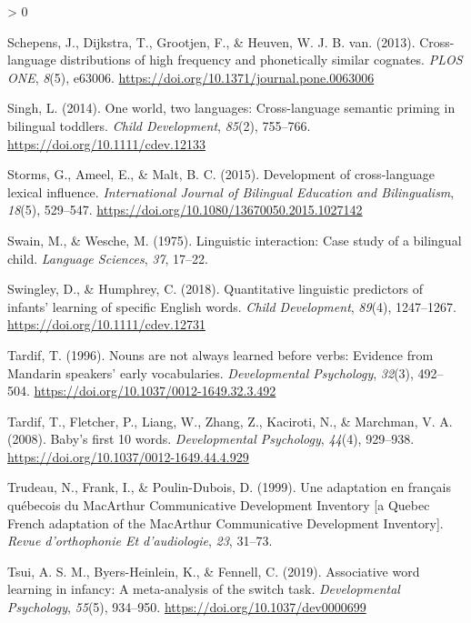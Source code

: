\documentclass[
  english,
  ,man,floatsintext]{apa6}
\newlength{\cslhangindent}
\newenvironment{CSLReferences}[2] %
 {%
  \setlength{\parindent}{0pt}
  \ifodd #1 \everypar{\setlength{\hangindent}{\cslhangindent}}\ignorespaces\fi
  \ifnum #2 > 0
  \setlength{\parskip}{#2\baselineskip}
  \fi
 }%
 {}
\begin{document}
\begin{CSLReferences}{1}{0}
\leavevmode\hypertarget{ref-Schepens_etal_2013}{}%
Schepens, J., Dijkstra, T., Grootjen, F., \& Heuven, W. J. B. van. (2013). Cross-language distributions of high frequency and phonetically similar cognates. \emph{PLOS ONE}, \emph{8}(5), e63006. \url{https://doi.org/10.1371/journal.pone.0063006}

\leavevmode\hypertarget{ref-Singh_2014}{}%
Singh, L. (2014). One world, two languages: Cross-language semantic priming in bilingual toddlers. \emph{Child Development}, \emph{85}(2), 755--766. \url{https://doi.org/10.1111/cdev.12133}

\leavevmode\hypertarget{ref-Storms_etal_2015}{}%
Storms, G., Ameel, E., \& Malt, B. C. (2015). Development of cross-language lexical influence. \emph{International Journal of Bilingual Education and Bilingualism}, \emph{18}(5), 529--547. \url{https://doi.org/10.1080/13670050.2015.1027142}

\leavevmode\hypertarget{ref-Swain_Wesche_1975}{}%
Swain, M., \& Wesche, M. (1975). Linguistic interaction: Case study of a bilingual child. \emph{Language Sciences}, \emph{37}, 17--22.

\leavevmode\hypertarget{ref-Swingley_Humphrey_2018}{}%
Swingley, D., \& Humphrey, C. (2018). Quantitative linguistic predictors of infants' learning of specific {E}nglish words. \emph{Child Development}, \emph{89}(4), 1247--1267. \url{https://doi.org/10.1111/cdev.12731}

\leavevmode\hypertarget{ref-Tardif_1996}{}%
Tardif, T. (1996). Nouns are not always learned before verbs: Evidence from {M}andarin speakers' early vocabularies. \emph{Developmental Psychology}, \emph{32}(3), 492--504. \url{https://doi.org/10.1037/0012-1649.32.3.492}

\leavevmode\hypertarget{ref-Tardif_etal_2008}{}%
Tardif, T., Fletcher, P., Liang, W., Zhang, Z., Kaciroti, N., \& Marchman, V. A. (2008). Baby's first 10 words. \emph{Developmental Psychology}, \emph{44}(4), 929--938. \url{https://doi.org/10.1037/0012-1649.44.4.929}

\leavevmode\hypertarget{ref-Trudeau_etal_1999}{}%
Trudeau, N., Frank, I., \& Poulin-Dubois, D. (1999). Une adaptation en français québecois du MacArthur {C}ommunicative {D}evelopment {I}nventory {[}a {Q}uebec {F}rench adaptation of the MacArthur {C}ommunicative {D}evelopment {I}nventory{]}. \emph{Revue d'orthophonie Et d'audiologie}, \emph{23}, 31--73.

\leavevmode\hypertarget{ref-Tsui_etal_2019}{}%
Tsui, A. S. M., Byers-Heinlein, K., \& Fennell, C. (2019). Associative word learning in infancy: A meta-analysis of the switch task. \emph{Developmental Psychology}, \emph{55}(5), 934--950. \url{https://doi.org/10.1037/dev0000699}


\end{CSLReferences}
\end{document}
